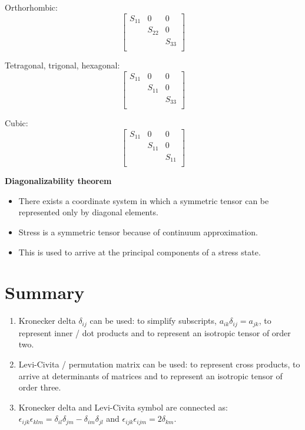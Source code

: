 Orthorhombic:
\begin{equation*}
\left[
\begin{array}{lll}
S_{11} & 0 & 0 \\
 & S_{22} & 0 \\
 &  & S_{33} \\
\end{array}
\right]
\end{equation*}

Tetragonal, trigonal, hexagonal:
\begin{equation*}
\left[
\begin{array}{lll}
S_{11} & 0 & 0 \\
 & S_{11} & 0 \\
 &  & S_{33} \\
\end{array}
\right]
\end{equation*}

Cubic:
\begin{equation*}
\left[
\begin{array}{lll}
S_{11} & 0 & 0 \\
 & S_{11} & 0 \\
 &  & S_{11} \\
\end{array}
\right]
\end{equation*}


{\bf Diagonalizability theorem}

\begin{itemize}

\item There exists a coordinate system in which a symmetric tensor can be represented only by diagonal elements.
\item Stress is a symmetric tensor because of continuum approximation.
\item This is used to arrive at the principal components of a stress state.
\end{itemize}


\section{Summary}

\begin{enumerate}
\item Kronecker delta $\delta_{ij}$ can be used: to simplify subscripts, $a_{ik} \delta_{ij} = a_{jk}$, to represent inner / dot products and to represent an isotropic tensor of order two.
\item Levi-Civita / permutation matrix can be used: to represent cross products, to arrive at determinants of matrices and to represent an isotropic tensor of order three.
\item Kronecker delta and Levi-Civita symbol are connected as: $\epsilon_{ijk} \epsilon_{klm} = \delta_{il} \delta_{jm} - \delta_{im} \delta_{jl}$ and $\epsilon_{ijk} \epsilon_{ijm} = 2 \delta_{km}$.
\end{enumerate}

